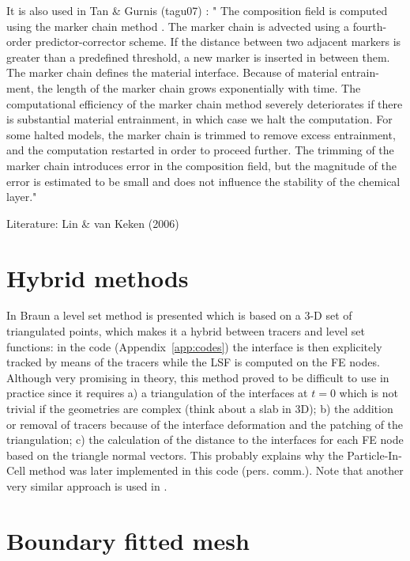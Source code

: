 It is also used in Tan \& Gurnis (tagu07) \cite{tagu07}: "
The composition field is computed using the marker
chain method \cite{dagu86,vaks97}. The marker chain is advected using a fourth-order
predictor-corrector scheme. If the distance between two
adjacent markers is greater than a predefined threshold, a
new marker is inserted in between them. The marker chain
defines the material interface. Because of material entrain-
ment, the length of the marker chain grows exponentially
with time. The computational efficiency of the marker chain
method severely deteriorates if there is substantial material
entrainment, in which case we halt the computation. For
some halted models, the marker chain is trimmed to remove
excess entrainment, and the computation restarted in order
to proceed further. The trimming of the marker chain
introduces error in the composition field, but the magnitude
of the error is estimated to be small and does not influence
the stability of the chemical layer."

Literature: Lin \& van Keken (2006) \cite{liva05,liva06a,liva06b,kaus05,mulyukova}

\section{Hybrid methods}

In Braun \etal \cite{brtf08} a level set method is presented which is based on a 3-D set
of triangulated points, which makes it a hybrid between tracers and level set functions:
in the \douar code (Appendix~\ref{app:codes}) the interface is then explicitely tracked by means of the tracers while the LSF is computed 
on the FE nodes. Although very promising in theory, this method proved to be difficult to use in practice
since it requires a) a triangulation of the interfaces at $t=0$ which is not trivial if the geometries
are complex (think about a slab in 3D); b) the addition or removal of tracers because of the interface deformation
and the patching of the triangulation; c) the calculation of the distance to the interfaces for each 
FE node based on the triangle normal vectors. 
This probably explains why the Particle-In-Cell method was later implemented in this code (pers. comm.).
Note that another very similar approach is used in \cite{saev10}.



\section{Boundary fitted mesh}

